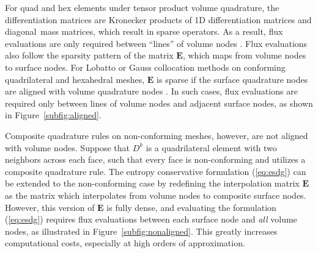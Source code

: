 \documentclass{svjour3}                     %
\begin{document}
For quad and hex elements under tensor product volume quadrature, the differentiation matrices are Kronecker products of 1D differentiation matrices and diagonal mass matrices, which result in sparse operators.  As a result, flux evaluations are only required between ``lines'' of volume nodes \cite{carpenter2014entropy, chan2018efficient}.  Flux evaluations also follow the sparsity pattern of the matrix $\bm{E}$, which maps from volume nodes to surface nodes.  For Lobatto or Gauss collocation methods on conforming quadrilateral and hexahedral meshes, $\bm{E}$ is sparse if the surface quadrature nodes are aligned with volume quadrature nodes \cite{chan2018efficient}.  In such cases, flux evaluations are required only between lines of volume nodes and adjacent surface nodes, as shown in Figure~\ref{subfig:aligned}.

Composite quadrature rules on non-conforming meshes, however, are not aligned with volume nodes.  Suppose that $D^k$ is a quadrilateral element with two neighbors across each face, such that every face is non-conforming and utilizes a composite quadrature rule.  The entropy conservative formulation (\ref{eq:esdg}) can be extended to the non-conforming case by redefining the interpolation matrix $\bm{E}$ as the matrix which interpolates from volume nodes to composite surface nodes.  However, this version of $\bm{E}$ is fully dense, and evaluating the formulation (\ref{eq:esdg}) requires flux evaluations between each surface node and \textit{all} volume nodes, as illustrated in Figure~\ref{subfig:nonaligned}.  This greatly increases computational costs, especially at high orders of approximation.  %
\end{document}
